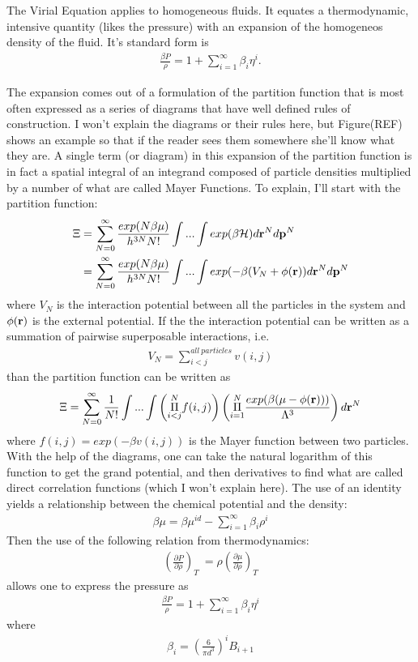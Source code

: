 The Virial Equation applies to homogeneous fluids.  It equates a
thermodynamic, intensive quantity (likes the pressure) with an
expansion of the homogeneos density of the fluid.  It's standard form
is
\begin{align}
  \frac{\beta P}{\rho} = 1 + \sum_{i=1}^{\infty}\beta_i\eta^i.
\end{align}

The expansion comes out of a formulation of the partition function
that is most often expressed as a series of diagrams that have well
defined rules of construction.  I won't explain the diagrams or their
rules here, but Figure(REF) shows an example so that if the reader
sees them somewhere she'll know what they are.  A single term (or
diagram) in this expansion of the partition function is in fact a
spatial integral of an integrand composed of particle densities
multiplied by a number of what are called Mayer Functions.  To
explain, I'll start with the partition function:
\begin{align}
  \Xi &= \sum_{N=0}^{\infty}\frac{exp(N\beta\mu)}{h^{3N}N!}\int...\int exp(\beta \mathcal{H})d\textbf{r}^Nd\mathbf{p}^N \\
  &=\sum_{N=0}^{\infty}\frac{exp(N\beta\mu)}{h^{3N}N!}\int...\int exp(-\beta (V_N + \phi(\textbf{r}))d\textbf{r}^Nd\mathbf{p}^N
\end{align}
where $V_N$ is the interaction potential between all the particles in
the system and $\phi(\textbf{r})$ is the external potential.  If the the
interaction potential can be written as a summation of pairwise
superposable interactions, i.e.
\begin{align}
  V_N = \sum_{i<j}^{all~particles} v(i,j)
\end{align}
 than the partition function can be written as
\begin{align}
  \Xi = \sum_{N=0}^{\infty}\frac{1}{N!}\int... \int \left(\overset{N}{\underset{i<j}{\Pi}} f(i,j)\right)
  \left( \overset{N}{\underset{i=1}{\Pi}} \frac{exp(\beta (\mu - \phi(\textbf{r})))}{\Lambda^3}\right)d\textbf{r}^N
\end{align}
where $f(i,j)=exp(-\beta v(i,j))$ is the Mayer function between two
particles.  With the help of the diagrams, one can take the natural
logarithm of this function to get the grand potential, and then
derivatives to find what are called direct correlation functions
(which I won't explain here). The use of an identity yields a
relationship between the chemical potential and the density:
\begin{align}
  \beta \mu = \beta \mu^{id} - \sum_{i=1}^{\infty}\beta_i\rho^i
\end{align}
Then the use of the following relation from thermodynamics:
\begin{align}
  \left(\frac{\partial P}{\partial \rho}\right)_T \
  = \rho \left(\frac{\partial \mu}{\partial \rho}\right)_T
\end{align}
allows one to express the pressure as
\begin{align}
  \frac{\beta P}{\rho} = 1 + \sum_{i=1}^{\infty}\beta_i\eta^i
\end{align}
where
\begin{align}
  \label{eq:virial-coeff}
  \beta_i = (\frac{6}{\pi d^3})^i B_{i+1}
\end{align}


